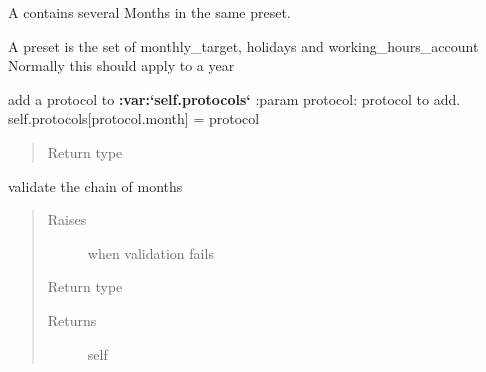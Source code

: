 \documentclass[letterpaper,10pt,english]{sphinxmanual}
\begin{document}
\begin{fulllineitems}
\label{\detokenize{devmanual:protocol.Season}}
A {\hyperref[\detokenize{devmanual:protocol.Season}]{}} contains several Months in the same preset.

A preset is the set of monthly\_target, holidays and working\_hours\_account
Normally this should apply to a year

\begin{fulllineitems}
\label{\detokenize{devmanual:protocol.Season.add_month}}
add a protocol to {\color{red}\bfseries{}:var:{}`self.protocols{}`}
:param protocol: protocol to add.
self.protocols{[}protocol.month{]} = protocol
\begin{quote}\begin{description}
\item[{Return type}] \leavevmode
{\hyperref[\detokenize{devmanual:protocol.Season}]{}}

\end{description}\end{quote}

\end{fulllineitems}


\begin{fulllineitems}
\label{\detokenize{devmanual:protocol.Season.validate}}
validate the chain of months
\begin{quote}\begin{description}
\item[{Raises}] \leavevmode
{} \textendash{} when validation fails

\item[{Return type}] \leavevmode
{\hyperref[\detokenize{devmanual:protocol.Season}]{}}

\item[{Returns}] \leavevmode
self

\end{description}\end{quote}

\end{fulllineitems}


\end{fulllineitems}
\end{document}
